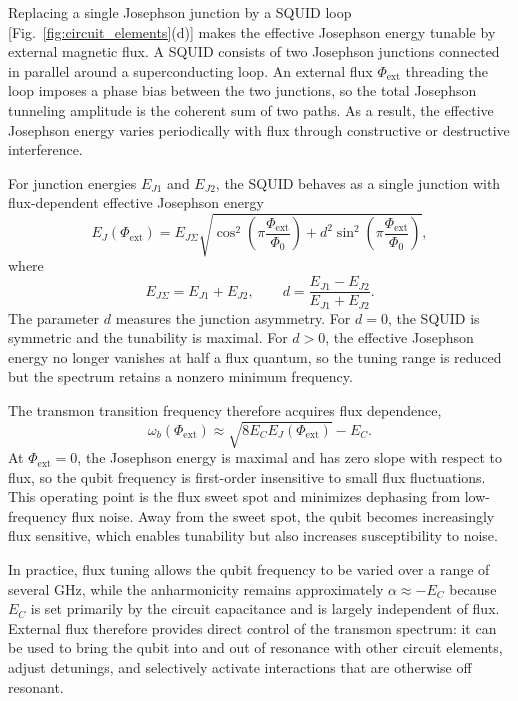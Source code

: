 Replacing a single Josephson junction by a SQUID loop [Fig.~\ref{fig:circuit_elements}(d)] makes the effective Josephson energy tunable by external magnetic flux. A SQUID consists of two Josephson junctions connected in parallel around a superconducting loop. An external flux $\Phi_{\mathrm{ext}}$ threading the loop imposes a phase bias between the two junctions, so the total Josephson tunneling amplitude is the coherent sum of two paths. As a result, the effective Josephson energy varies periodically with flux through constructive or destructive interference.

For junction energies $E_{J1}$ and $E_{J2}$, the SQUID behaves as a single junction with flux-dependent effective Josephson energy
\begin{equation}
    E_J(\Phi_{\mathrm{ext}})
    =
    E_{J\Sigma}
    \sqrt{
        \cos^2\!\left(\pi\frac{\Phi_{\mathrm{ext}}}{\Phi_0}\right)
        +
        d^2
        \sin^2\!\left(\pi\frac{\Phi_{\mathrm{ext}}}{\Phi_0}\right)
    },
\end{equation}
where
\begin{equation}
    E_{J\Sigma} = E_{J1}+E_{J2},
    \qquad
    d = \frac{E_{J1}-E_{J2}}{E_{J1}+E_{J2}}.
\end{equation}
The parameter $d$ measures the junction asymmetry. For $d=0$, the SQUID is symmetric and the tunability is maximal. For $d>0$, the effective Josephson energy no longer vanishes at half a flux quantum, so the tuning range is reduced but the spectrum retains a nonzero minimum frequency.

The transmon transition frequency therefore acquires flux dependence,
\begin{equation}
    \omega_b(\Phi_{\mathrm{ext}})
    \approx
    \sqrt{8E_C E_J(\Phi_{\mathrm{ext}})}
    -
    E_C.
\end{equation}
At $\Phi_{\mathrm{ext}}=0$, the Josephson energy is maximal and has zero slope with respect to flux, so the qubit frequency is first-order insensitive to small flux fluctuations. This operating point is the flux sweet spot and minimizes dephasing from low-frequency flux noise. Away from the sweet spot, the qubit becomes increasingly flux sensitive, which enables tunability but also increases susceptibility to noise.

In practice, flux tuning allows the qubit frequency to be varied over a range of several GHz, while the anharmonicity remains approximately $\alpha \approx -E_C$ because $E_C$ is set primarily by the circuit capacitance and is largely independent of flux. External flux therefore provides direct control of the transmon spectrum: it can be used to bring the qubit into and out of resonance with other circuit elements, adjust detunings, and selectively activate interactions that are otherwise off resonant.

